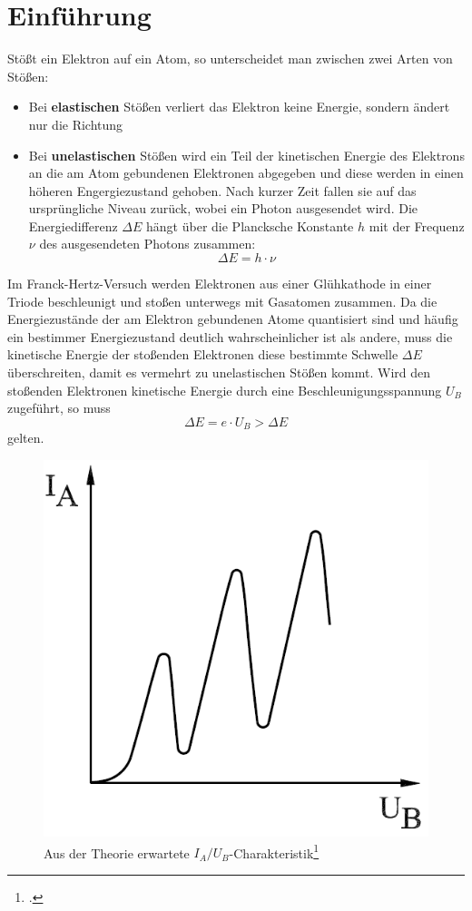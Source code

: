 \section{Einführung}
Stößt ein Elektron auf ein Atom, so unterscheidet man zwischen zwei Arten von Stößen:
\begin{itemize}
	\item Bei \textbf{elastischen} Stößen verliert das Elektron keine Energie, sondern ändert nur die Richtung
	\item Bei \textbf{unelastischen} Stößen wird ein Teil der kinetischen Energie des Elektrons an die am Atom gebundenen Elektronen abgegeben und diese werden in einen höheren Engergiezustand gehoben. Nach kurzer Zeit fallen sie auf das ursprüngliche Niveau zurück, wobei ein Photon ausgesendet wird. Die Energiedifferenz $\Delta E$ hängt über die Plancksche Konstante $h$ mit der Frequenz $\nu$ des ausgesendeten Photons zusammen:
	\begin{equation}
		\Delta E=h\cdot\nu
		\label{eq:deltae}
	\end{equation}
\end{itemize}
Im Franck-Hertz-Versuch werden Elektronen aus einer Glühkathode in einer Triode beschleunigt und stoßen unterwegs mit Gasatomen zusammen. 
Da die Energiezustände der am Elektron gebundenen Atome quantisiert sind und häufig ein bestimmer Energiezustand deutlich wahrscheinlicher ist als andere, muss die kinetische Energie der stoßenden Elektronen diese bestimmte Schwelle $\Delta E$ überschreiten, damit es vermehrt zu unelastischen Stößen kommt. Wird den stoßenden Elektronen kinetische Energie durch eine Beschleunigungsspannung $U_B$ zugeführt, so muss
\begin{equation}
	\Delta E=e\cdot U_B > \Delta E
	\label{eq:energieschwelle}
\end{equation}
gelten.
\begin{figure}[H]
  \centering
  \includegraphics[width=.3\textwidth]{res/theoriekurve}
  \caption{Aus der Theorie erwartete $I_A/U_B$-Charakteristik\footcite{anleitung-ss2015}}
  \label{fig:theoriekurve}
\end{figure}
